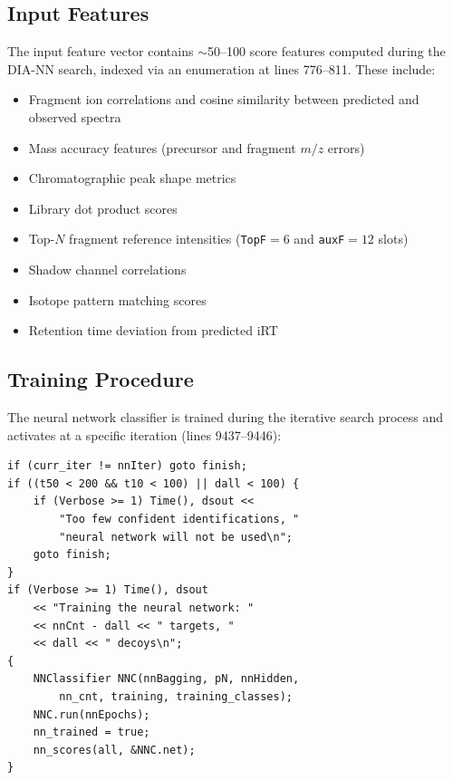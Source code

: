 \documentclass[11pt,a4paper]{article}
\begin{document}
\subsection{Input Features}

The input feature vector contains $\sim$50--100 score features computed during the DIA-NN search, indexed via an enumeration at lines 776--811. These include:

\begin{itemize}
    \item Fragment ion correlations and cosine similarity between predicted and observed spectra
    \item Mass accuracy features (precursor and fragment $m/z$ errors)
    \item Chromatographic peak shape metrics
    \item Library dot product scores
    \item Top-$N$ fragment reference intensities (\texttt{TopF}${}=6$ and \texttt{auxF}${}=12$ slots)
    \item Shadow channel correlations
    \item Isotope pattern matching scores
    \item Retention time deviation from predicted iRT
\end{itemize}

\subsection{Training Procedure}

The neural network classifier is trained during the iterative search process and activates at a specific iteration (lines 9437--9446):

\begin{lstlisting}[caption={NN training trigger}]
if (curr_iter != nnIter) goto finish;
if ((t50 < 200 && t10 < 100) || dall < 100) {
    if (Verbose >= 1) Time(), dsout <<
        "Too few confident identifications, "
        "neural network will not be used\n";
    goto finish;
}
if (Verbose >= 1) Time(), dsout
    << "Training the neural network: "
    << nnCnt - dall << " targets, "
    << dall << " decoys\n";
{
    NNClassifier NNC(nnBagging, pN, nnHidden,
        nn_cnt, training, training_classes);
    NNC.run(nnEpochs);
    nn_trained = true;
    nn_scores(all, &NNC.net);
}
\end{lstlisting}
\end{document}
